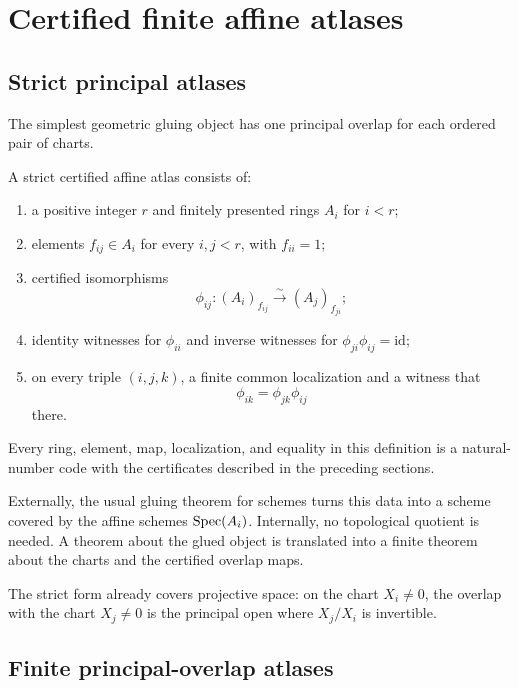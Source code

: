 \section{Certified finite affine atlases}

\subsection{Strict principal atlases}

The simplest geometric gluing object has one principal overlap for each ordered pair of charts.

\begin{definition}\label{def:strict-atlas}
A strict certified affine atlas consists of:
\begin{enumerate}[label=(\alph*)]
\item a positive integer $r$ and finitely presented rings $A_i$ for $i<r$;
\item elements $f_{ij}\in A_i$ for every $i,j<r$, with $f_{ii}=1$;
\item certified isomorphisms
\[
           \phi_{ij}:(A_i)_{f_{ij}}\xrightarrow{\sim}(A_j)_{f_{ji}};
\]
\item identity witnesses for $\phi_{ii}$ and inverse witnesses for
      $\phi_{ji}\phi_{ij}=\mathrm{id}$;
\item on every triple $(i,j,k)$, a finite common localization and a witness that
\[
                         \phi_{ik}=\phi_{jk}\phi_{ij}
\]
there.
\end{enumerate}
Every ring, element, map, localization, and equality in this definition is a natural-number code
with the certificates described in the preceding sections.
\end{definition}

Externally, the usual gluing theorem for schemes turns this data into a scheme covered by the affine
schemes $\operatorname{Spec}(A_i)$.  Internally, no topological quotient is needed.  A theorem about the glued
object is translated into a finite theorem about the charts and the certified overlap maps.

The strict form already covers projective space: on the chart $X_i\neq0$, the overlap with the chart
$X_j\neq0$ is the principal open where $X_j/X_i$ is invertible.

\subsection{Finite principal-overlap atlases}

